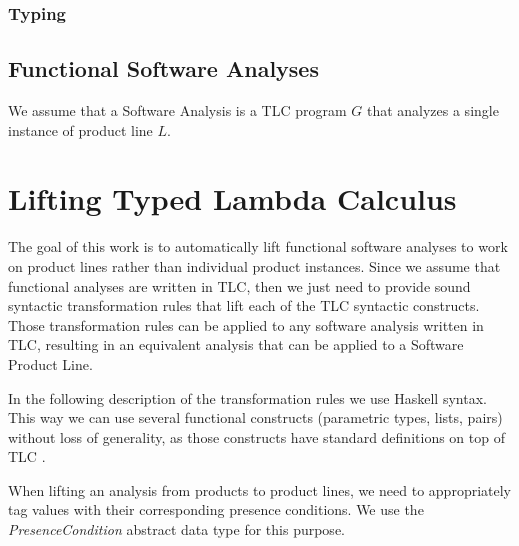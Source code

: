 \documentclass[10pt,conference]{IEEEtran}
\begin{document}
\subsubsection{Typing}

\begin{prooftree}
\end{prooftree}

\begin{prooftree}
\end{prooftree}

\begin{prooftree}
\end{prooftree}

\subsection{Functional Software Analyses}
We assume that a Software Analysis is a TLC program $G$ that analyzes a single instance of product line $L$. 


\section{Lifting Typed Lambda Calculus}

The goal of this work is to automatically lift functional software analyses to work on product lines rather than individual product instances. Since we assume that functional analyses are written in TLC, then we just need to provide sound syntactic transformation rules that lift each of the TLC syntactic constructs. Those transformation rules can be applied to any software analysis written in TLC, resulting in an equivalent analysis that can be applied to a Software Product Line.

In the following description of the transformation rules we use Haskell syntax. This way we can use several functional constructs (parametric types, lists, pairs) without loss of generality, as those constructs have standard definitions on top of TLC \cite{Pierce2002}.

When lifting an analysis from products to product lines, we need to appropriately tag values with their corresponding presence conditions. We use the \emph{PresenceCondition} abstract data type for this purpose.
\end{document}
